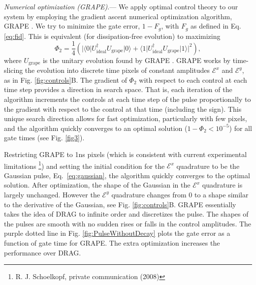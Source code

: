 \documentclass[prl,twocolumn,aps,final,floatfix,superscriptaddress,showpacs]{revtex4}
\newcommand{\dg}{^\dagger}
\newcommand{\bra}[1]{\langle{#1}|}
\newcommand{\ket}[1]{|{#1}\rangle}
\newcommand{\eqrf}[1]{Eq.~\eqref{#1}}
\renewcommand{\section}[1]{{\em #1}.---}
\begin{document}
\section{Numerical optimization (GRAPE)} 
We apply optimal control theory to our system by employing the gradient ascent numerical optimization algorithm, GRAPE \cite{Khaneja:2005a}.  We try to minimize the gate error, $1-F_g$, with $F_g$ as defined in Eq. \eqref{eq:fid}.  This is equivalent (for dissipation-free evolution) to maximizing
\begin{equation}
\Phi_2 = \frac{1}{4}(|\bra{0}U_\mathrm{ideal}\dg U_\mathrm{grape}\ket{0}+\bra{1}U_\mathrm{ideal}\dg U_\mathrm{grape}\ket{1}|^2),
\end{equation} 
where $U_\mathrm{grape}$ is the unitary evolution found by GRAPE  \cite{Rebentrost:2008a}. GRAPE works by time-slicing the evolution into discrete time pixels of constant amplitudes $\mathcal{E}^x$ and $\mathcal{E}^y$, as in Fig. \ref{fig:controls}B. The gradient of $\Phi_2$ with respect to each control at each time step provides a  direction in search space.  That is, each iteration of the algorithm increments the controls at each time step of the pulse proportionally to the gradient with respect to the control at that time (including the sign).  This unique search direction allows for fast optimization, particularly with few pixels, and the algorithm quickly converges to an optimal solution ($1-\Phi_2<10^{-5}$) for all gate times
(see Fig. \ref{fig3}).    


Restricting GRAPE to 1ns pixels (which is consistent with current experimental limitations \footnote{R. J. Schoelkopf, private communication (2008)}) and setting the initial condition for the $\mathcal{E}^x$ quadrature to be the Gaussian pulse, \eqrf{eq:gaussian}, the algorithm quickly converges to the optimal solution. After optimization, the shape of the Gaussian in the $\mathcal{E}^x$ quadrature is largely unchanged. However the $\mathcal{E}^y$ quadrature changes from 0 to a shape similar to the derivative of the Gaussian, see Fig. \ref{fig:controls}B.  GRAPE essentially takes the idea of DRAG to infinite order and discretizes the pulse. The shapes of the pulses are smooth with no sudden rises or falls in the control amplitudes. The purple dotted line in Fig. \ref{fig:PulseWithoutDecay} plots the gate error as a function of gate time for GRAPE. The extra optimization increases the performance over DRAG.
\end{document}
